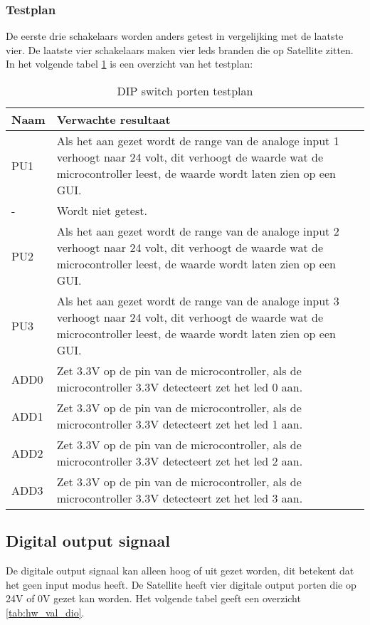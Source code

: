 \subsubsection{Testplan}
De eerste drie schakelaars worden anders getest in vergelijking met de laatste vier. De laatste vier schakelaars maken vier leds branden die op Satellite zitten. In het volgende tabel \ref{tab:hw_val_dip_testplan} is een overzicht van het testplan:
\begin{table}[h!]
	\caption{DIP switch porten testplan}
	\begin{tabular}{lp{14.5cm}}
	\toprule
	\textbf{Naam} 	& \textbf{Verwachte resultaat} \\ \toprule
	PU1				& Als het aan gezet wordt de range van de analoge input 1 verhoogt naar 24 volt, dit verhoogt de waarde wat de microcontroller leest, de waarde wordt laten zien op een GUI.\\
	-				& Wordt niet getest. \\
	PU2				& Als het aan gezet wordt de range van de analoge input 2 verhoogt naar 24 volt, dit verhoogt de waarde wat de microcontroller leest, de waarde wordt laten zien op een GUI.\\
	PU3				& Als het aan gezet wordt de range van de analoge input 3 verhoogt  naar 24 volt, dit verhoogt de waarde wat de microcontroller leest, de waarde wordt laten zien op een GUI. \\
	ADD0 			& Zet 3.3V op de pin van de microcontroller, als de microcontroller 3.3V detecteert zet het led 0 aan.\\
	ADD1 			& Zet 3.3V op de pin van de microcontroller, als de microcontroller 3.3V detecteert zet het led 1 aan.\\
	ADD2 			& Zet 3.3V op de pin van de microcontroller, als de microcontroller 3.3V detecteert zet het led 2 aan.\\
	ADD3 			& Zet 3.3V op de pin van de microcontroller, als de microcontroller 3.3V detecteert zet het led 3 aan.\\ \bottomrule
	\end{tabular}
	\label{tab:hw_val_dip_testplan}
\end{table}

\newpage
\subsection{Digital output signaal}
De digitale output signaal kan alleen hoog of uit gezet worden, dit betekent dat het geen input modus heeft. De Satellite heeft vier digitale output porten die op 24V of 0V gezet kan worden. Het volgende tabel geeft een overzicht \ref{tab:hw_val_dio}.
